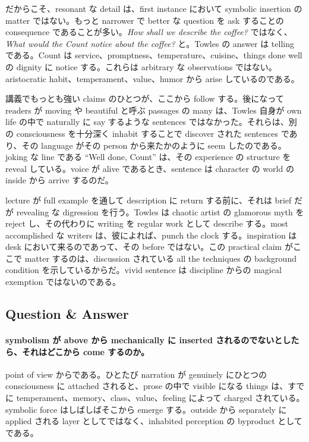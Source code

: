 だからこそ、resonant な detail は、first instance において symbolic insertion の matter ではない。もっと narrower で better な question を ask することの consequence であることが多い。\emph{How shall we describe the coffee?} ではなく、\emph{What would the Count notice about the coffee?} と。Towles の answer は telling である。Count は service、promptness、temperature、cuisine、things done well の dignity に notice する。これらは arbitrary な observations ではない。aristocratic habit、temperament、value、humor から arise しているのである。

講義でもっとも強い claims のひとつが、ここから follow する。後になって readers が moving や beautiful と呼ぶ passages の many は、Towles 自身が own life の中で naturally に say するような sentences ではなかった。それらは、別の consciousness を十分深く inhabit することで discover された sentences であり、その language がその person から来たかのように seem したのである。joking な line である ``Well done, Count'' は、その experience の structure を reveal している。voice が alive であるとき、sentence は character の world の inside から arrive するのだ。

lecture が full example を通して description に return する前に、それは brief だが revealing な digression を行う。Towles は chaotic artist の glamorous myth を reject し、その代わりに writing を regular work として describe する。most accomplished な writers は、彼によれば、punch the clock する。inspiration は desk において来るのであって、その before ではない。この practical claim がここで matter するのは、discussion されている all the techniques の background condition を示しているからだ。vivid sentence は discipline からの magical exemption ではないのである。

\subsection{Question \& Answer}

\paragraph{symbolism が above から mechanically に inserted されるのでないとしたら、それはどこから come するのか。}

point of view からである。ひとたび narration が genuinely にひとつの consciousness に attached されると、prose の中で visible になる things は、すでに temperament、memory、class、value、feeling によって charged されている。symbolic force はしばしばそこから emerge する。outside から separately に applied される layer としてではなく、inhabited perception の byproduct としてである。

